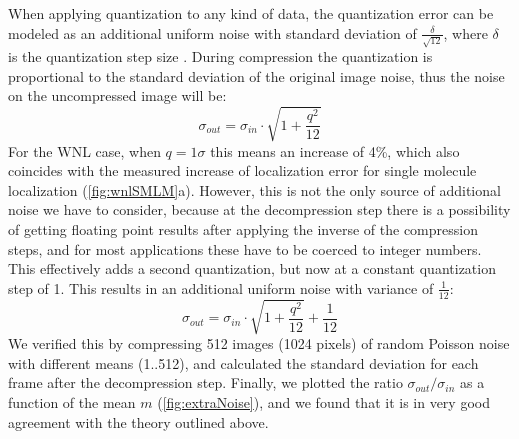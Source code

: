     When applying quantization to any kind of data, the quantization error can be modeled as an additional uniform noise with standard deviation of $\frac{\delta}{\sqrt{12}}$, where $\delta$ is the quantization step size \cite{gray_quantization_1998}. During compression the quantization is proportional to the standard deviation of the original image noise, thus the noise on the uncompressed image will be:
    \begin{equation}
      \sigma_{out} = \sigma_{in} \cdot \sqrt{1+ \frac{q^2}{12}}
    \end{equation}
    For the WNL case, when $q = 1 \sigma$ this means an increase of 4\%, which also coincides with the measured increase of localization error for single molecule localization (\autoref{fig:wnlSMLM}a). However, this is not the only source of additional noise we have to consider, because at the decompression step there is a possibility of getting floating point results after applying the inverse of the compression steps, and for most applications these have to be coerced to integer numbers. This effectively adds a second quantization, but now at a constant quantization step of 1. This results in an additional uniform noise with variance of $\frac{1}{12}$:
    \begin{equation}
      \sigma_{out} = \sigma_{in} \cdot \sqrt{1+ \frac{q^2}{12}} + \frac{1}{12}
      \label{eq:extraNoise}
    \end{equation}
    We verified this by compressing 512 images (1024 pixels) of random Poisson noise with different means (1..512), and calculated the standard deviation for each frame after the decompression step. Finally, we plotted the ratio $\sigma_{out}/\sigma_{in}$ as a function of the mean $m$ (\autoref{fig:extraNoise}), and we found that it is in very good agreement with the theory outlined above.

    

    


